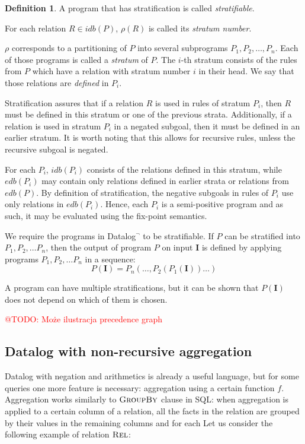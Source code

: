 \documentclass{pracamgr}
\makeatletter
\theoremstyle{plain}
\theoremstyle{definition}
\newtheorem{defn}{Definition}[section]
\theoremstyle{remark}
\newcommand{\todo}[1]{\textcolor{red}{@TODO: #1}}
\newcommand{\datalogneg}{Datalog$^{\neg}$ }
\makeatother
\begin{document}
\begin{defn}
A program that has stratification is called \emph{stratifiable}.
\end{defn}

For each relation $R \in idb(P )$, $\rho(R)$ is called its \emph{stratum number}.

$\rho$ corresponds to a partitioning of $P$ into several subprograms $P_1, P_2, \dots, P_n$. Each of those programs is called a \emph{stratum} of $P$. The $i$-th stratum consists of the rules from $P$ which have a relation with stratum number $i$ in their head. We say that those relations are \emph{defined} in $P_i$.

Stratification assures that if a relation $R$ is used in rules of stratum $P_i$, then $R$ must be defined in this stratum or one of the previous strata. Additionally, if a relation is used in stratum $P_i$ in a negated subgoal, then it must be defined in an earlier stratum. It is worth noting that this allows for recursive rules, unless the recursive subgoal is negated.

For each $P_i$, $idb(P_i)$ consists of the relations defined in this stratum, while $edb(P_i)$ may contain only relations defined in earlier strata or relations from $edb(P)$. By definition of stratification, the negative subgoals in rules of $P_i$ use only relations in $edb(P_i)$. Hence, each $P_i$ is a semi-positive program and as such, it may be evaluated using the fix-point semantics.

We require the programs in \datalogneg to be stratifiable. If $P$ can be stratified into $P_1, P_2, \dots P_n$, then the output of program $P$ on input $\textbf{I}$ is defined by applying programs $P_1, P_2, \dots P_n$ in a sequence:
$$P(\textbf{I}) = P_n(\dots, P_2(P_1(\textbf{I}))\dots)$$

A program can have multiple stratifications, but it can be shown that $P(\textbf{I})$ does not depend on which of them is chosen.

\todo{Może ilustracja precedence graph}

\subsection{Datalog with non-recursive aggregation}\label{ss:datalognra}

Datalog with negation and arithmetics is already a useful language, but for some queries one more feature is necessary: aggregation using a certain function $f$. Aggregation works similarly to $\textsc{GroupBy}$ clause in SQL: when aggregation is applied to a certain column of a relation, all the facts in the relation are grouped by their values in the remaining columns and for each 
Let us consider the following example of relation $\textsc{Rel}$:
\end{document}
